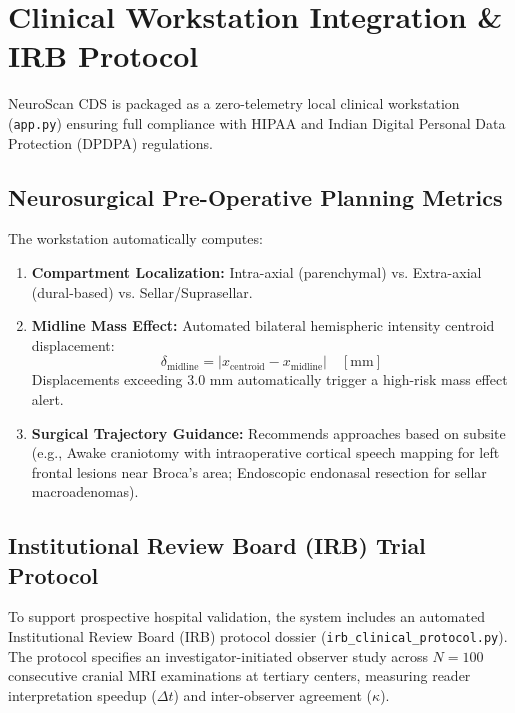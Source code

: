 \documentclass[journal,twocolumn,10pt]{IEEEtran}
\begin{document}
\section{Clinical Workstation Integration \& IRB Protocol}

NeuroScan CDS is packaged as a zero-telemetry local clinical workstation (\texttt{app.py}) ensuring full compliance with HIPAA and Indian Digital Personal Data Protection (DPDPA) regulations.

\subsection{Neurosurgical Pre-Operative Planning Metrics}
The workstation automatically computes:
\begin{enumerate}
    \item \textbf{Compartment Localization:} Intra-axial (parenchymal) vs. Extra-axial (dural-based) vs. Sellar/Suprasellar.
    \item \textbf{Midline Mass Effect:} Automated bilateral hemispheric intensity centroid displacement:
    \begin{equation}
        \delta_{\text{midline}} = |x_{\text{centroid}} - x_{\text{midline}}| \quad [\text{mm}]
    \end{equation}
    Displacements exceeding $3.0\text{ mm}$ automatically trigger a high-risk mass effect alert.
    \item \textbf{Surgical Trajectory Guidance:} Recommends approaches based on subsite (e.g., Awake craniotomy with intraoperative cortical speech mapping for left frontal lesions near Broca's area; Endoscopic endonasal resection for sellar macroadenomas).
\end{enumerate}

\subsection{Institutional Review Board (IRB) Trial Protocol}
To support prospective hospital validation, the system includes an automated Institutional Review Board (IRB) protocol dossier (\texttt{irb\_clinical\_protocol.py}). The protocol specifies an investigator-initiated observer study across $N = 100$ consecutive cranial MRI examinations at tertiary centers, measuring reader interpretation speedup ($\Delta t$) and inter-observer agreement ($\kappa$).
\end{document}
